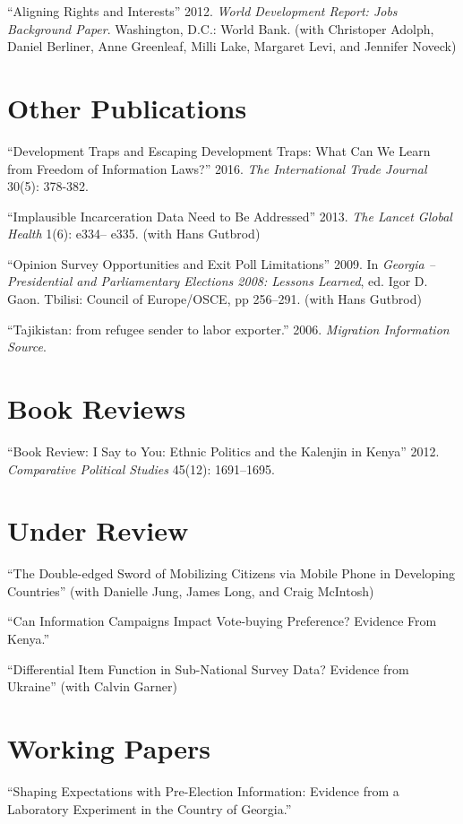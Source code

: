 \documentclass[margin,line]{res}
\begin{document}
{\begin{resume}
``Aligning Rights and
Interests'' 2012. \emph{World
  Development Report: Jobs Background Paper}. Washington, D.C.: World
Bank. (with Christoper Adolph, Daniel Berliner, Anne
Greenleaf, Milli Lake, Margaret Levi, and Jennifer Noveck)

\section{\sc  Other Publications}

``Development Traps and Escaping Development
Traps: What Can We Learn from Freedom of Information Laws?'' 2016. \emph{The International Trade Journal }30(5): 378-382.

``Implausible Incarceration
Data Need to Be Addressed'' 2013. \emph{The Lancet Global Health} 1(6):
e334-- e335. (with Hans Gutbrod)

``Opinion Survey Opportunities and Exit Poll
Limitations'' 2009. In \emph{Georgia -- Presidential and Parliamentary
  Elections 2008: Lessons Learned}, ed. Igor D. Gaon. Tbilisi: Council
of Europe/OSCE, pp 256--291. (with Hans Gutbrod)

``Tajikistan: from refugee sender to labor exporter.''
2006. \emph{Migration Information Source}.
 
\section{\sc Book Reviews}
``Book Review: I Say to You: Ethnic Politics and the Kalenjin in
Kenya'' 2012. \emph{Comparative Political Studies} 45(12): 1691--1695.

\section{\sc Under Review}
``The Double-edged Sword of Mobilizing Citizens via Mobile Phone in
Developing Countries'' (with Danielle Jung, James Long, and Craig
McIntosh)

``Can Information Campaigns Impact Vote-buying Preference? Evidence
From Kenya.'' 

``Differential Item Function in Sub-National Survey Data? Evidence
from Ukraine'' (with Calvin Garner)

\section{\sc Working Papers}

``Shaping Expectations with Pre-Election Information:
Evidence from a Laboratory Experiment in the Country of Georgia.''


\end{resume}}
\end{document}
